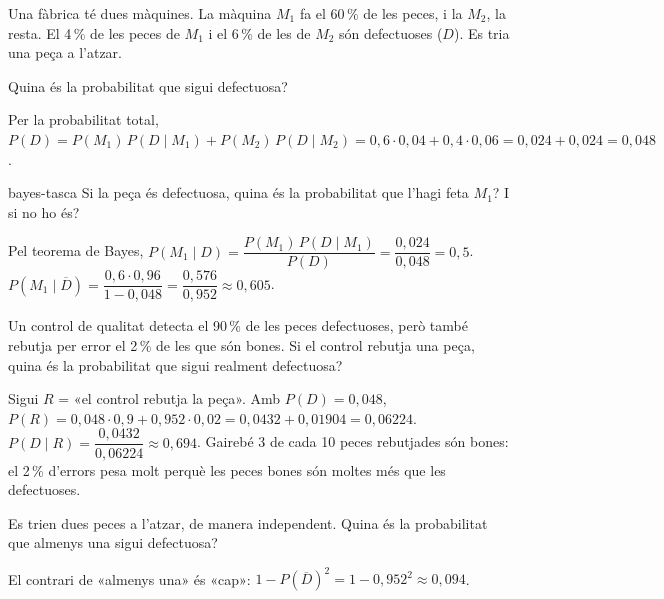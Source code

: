 Una fàbrica té dues màquines. La màquina $M_1$ fa el 60\,\% de les peces, i la $M_2$, la resta. El 4\,\% de les
peces de $M_1$ i el 6\,\% de les de $M_2$ són defectuoses ($D$). Es tria una peça a l'atzar.

\begin{apartats}

Quina és la probabilitat que sigui defectuosa?

\begin{solucio}
Per la probabilitat total, $P(D)=P(M_1)\,P(D\mid M_1)+P(M_2)\,P(D\mid M_2)=0{,}6\cdot0{,}04+0{,}4\cdot0{,}06
=0{,}024+0{,}024=0{,}048$.
\end{solucio}

\begin{tria}{bayes-tasca}
Si la peça és defectuosa, quina és la probabilitat que l'hagi feta $M_1$? I si no ho és?

\begin{solucio}
Pel teorema de Bayes, $P(M_1\mid D)=\dfrac{P(M_1)\,P(D\mid M_1)}{P(D)}=\dfrac{0{,}024}{0{,}048}=0{,}5$.\\
$P\left(M_1\mid\overline{D}\right)=\dfrac{0{,}6\cdot0{,}96}{1-0{,}048}=\dfrac{0{,}576}{0{,}952}\approx0{,}605$.
\end{solucio}

Un control de qualitat detecta el 90\,\% de les peces defectuoses, però també rebutja per error el 2\,\%
de les que són bones. Si el control rebutja una peça, quina és la probabilitat que sigui realment
defectuosa?

\begin{solucio}
Sigui $R$ = «el control rebutja la peça». Amb $P(D)=0{,}048$,
$P(R)=0{,}048\cdot0{,}9+0{,}952\cdot0{,}02=0{,}0432+0{,}01904=0{,}06224$.\\
$P(D\mid R)=\dfrac{0{,}0432}{0{,}06224}\approx0{,}694$. Gairebé 3 de cada 10 peces rebutjades són bones:
el 2\,\% d'errors pesa molt perquè les peces bones són moltes més que les defectuoses.
\end{solucio}
\end{tria}

\begin{nomesllarg}
Es trien dues peces a l'atzar, de manera independent. Quina és la probabilitat que almenys una sigui
defectuosa?

\begin{solucio}
El contrari de «almenys una» és «cap»: $1-P\left(\overline{D}\right)^2=1-0{,}952^2\approx0{,}094$.
\end{solucio}
\end{nomesllarg}

\end{apartats}
